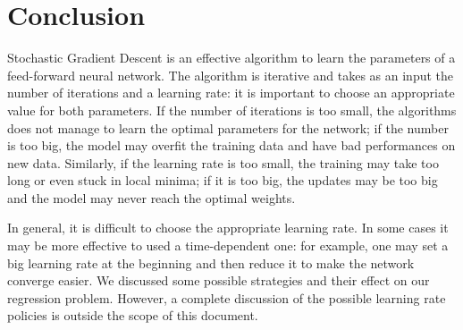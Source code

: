 \section{Conclusion}
\label{sec:conclusion}

Stochastic Gradient Descent is an effective algorithm to learn the parameters of a feed-forward neural network.
The algorithm is iterative and takes as an input the number of iterations and a learning rate:
it is important to choose an appropriate value for both parameters.
If the number of iterations is too small, the algorithms does not manage to learn the optimal parameters for the network;
if the number is too big, the model may overfit the training data and have bad performances on new data.
Similarly, if the learning rate is too small, the training may take too long or even stuck in local minima;
if it is too big, the updates may be too big and the model may never reach the optimal weights.

In general, it is difficult to choose the appropriate learning rate.
In some cases it may be more effective to used a time-dependent one:
for example, one may set a big learning rate at the beginning and then reduce it to make the network converge easier.
We discussed some possible strategies and their effect on our regression problem.
However, a complete discussion of the possible learning rate policies is outside the scope of this document.
